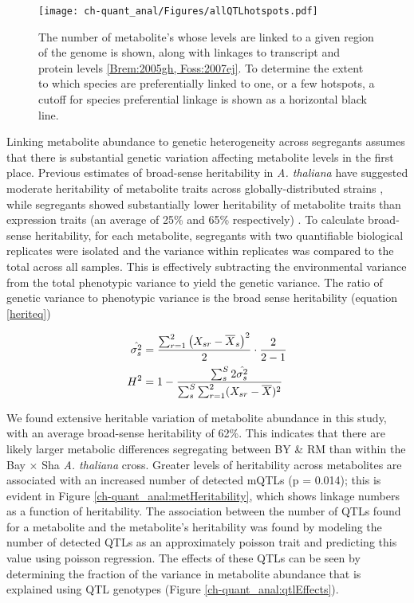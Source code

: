 \begin{figure}[h!]
\begin{center}
\texttt{[image: ch-quant\_anal/Figures/allQTLhotspots.pdf]}
\caption[Transcript, protein and metabolite QTL linkages]{The number of metabolite's whose levels are linked to a given region of the genome is shown, along with linkages to transcript and protein levels \ref{Brem:2005gh, Foss:2007ej}. To determine the extent to which species are preferentially linked to one, or a few hotspots, a cutoff for species preferential linkage is shown as a horizontal black line.}
\label{ch-quant_anal:qtlHotspots}
\end{center}
\end{figure}


Linking metabolite abundance to genetic heterogeneity across segregants assumes that there is substantial genetic variation affecting metabolite levels in the first place.  Previous estimates of broad-sense heritability \cite{Lynch:1998vx} in \textit{A. thaliana} have suggested moderate heritability of metabolite traits across globally-distributed strains \cite{Keurentjes:2006ik}, while segregants showed substantially lower heritability of metabolite traits than expression traits (an average of 25\% and 65\% respectively) \cite{Rowe:2008ty, West:2006bk}.  To calculate broad-sense heritability, for each metabolite, segregants with two quantifiable biological replicates were isolated and the variance within replicates was compared to the total across all samples.  This is effectively subtracting the environmental variance from the total phenotypic variance to yield the genetic variance.  The ratio of genetic variance to phenotypic variance is the broad sense heritability (equation \ref{heriteq})

\large{
\begin{align}
\hat{\sigma^{2}_{s}} &= \frac{\sum_{r = 1}^{2}\left(X_{sr} - \overline{X}_{s}\right)^2}{2} \cdot \frac{2}{2 - 1}\notag\\
H^{2} &= 1 -  \frac{\sum_{s}^{S}2\hat{\sigma^{2}_{s}}}{\sum_{s}^{S}\sum_{r = 1}^{2}(X_{sr} - \overline{X})^2}\label{heriteq}
\end{align}
}

We found extensive heritable variation of metabolite abundance in this study, with an average broad-sense heritability of 62\%.  This indicates that there are likely larger metabolic differences segregating between BY \& RM than within the Bay $\times$ Sha \textit{A. thaliana} cross. Greater levels of heritability across metabolites are associated with an increased number of detected mQTLs (p = 0.014); this is evident in Figure \ref{ch-quant_anal:metHeritability}, which shows linkage numbers as a function of heritability. The association between the number of QTLs found for a metabolite and the metabolite's heritability was found by modeling the number of detected QTLs as an approximately poisson trait and predicting this value using poisson regression. The effects of these QTLs can be seen by determining the fraction of the variance in metabolite abundance that is explained using QTL genotypes (Figure \ref{ch-quant_anal:qtlEffects}).  

